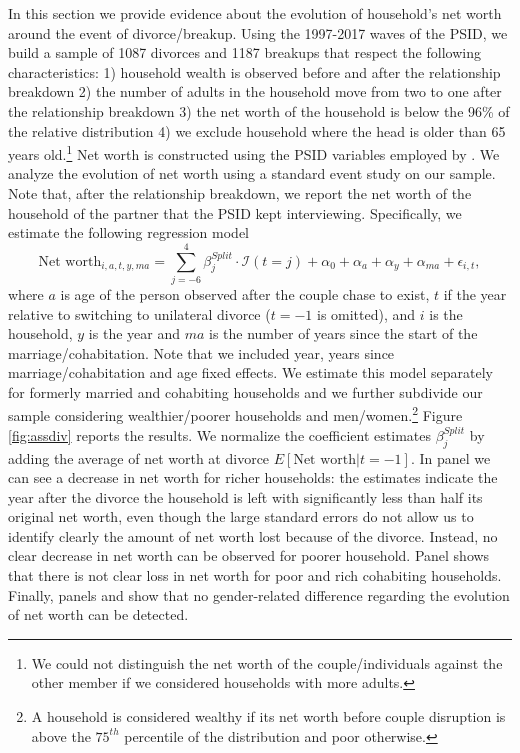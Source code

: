 \documentclass[12pt]{article}
\numberwithin{table}{section}
\begin{document}
In this section we provide evidence about the evolution of household's net worth around the event of divorce/breakup. Using the 1997-2017 waves of the PSID, we build a sample of 1087 divorces and 1187 breakups that respect the following characteristics: 1) household wealth is observed before and after the relationship  breakdown 2) the number of adults in the household move from two to one after the relationship breakdown 3) the net worth of the household is below the 96\% of the relative distribution 4) we exclude household where the head is older than 65 years old.\footnote{We could not distinguish the net worth of the couple/individuals against the other member if we considered households with more adults.} Net worth is constructed using the PSID variables employed by \cite{blundell2016}. We analyze the evolution of net worth using a standard event study on our sample. Note that, after the relationship breakdown, we report the net worth of the household of the partner that the PSID kept interviewing. Specifically, we estimate the following regression model
\begin{equation}\label{eq:ev_studa}
\text{Net worth}_{i,a,t,y,ma}=\sum_{j=-6}^{4}\beta^{Split}_j\cdot\mathcal{I}(t=j)+\alpha_{0}+\alpha_{a}+\alpha_{y}+\alpha_{ma}+\epsilon_{i,t},
\end{equation}
where $a$ is age of the person observed after the couple chase to exist, $t$ if the year relative to switching to unilateral divorce ($t=-1$ is omitted), and $i$ is the household, $y$ is the year and $ma$ is the number of years since the start of the marriage/cohabitation. Note that we included year, years since marriage/cohabitation and age fixed effects.  We estimate this model separately for formerly married and cohabiting households and we further subdivide our sample considering wealthier/poorer households and men/women.\footnote{A household is considered wealthy if its net worth before couple disruption is above the $75^{th}$ percentile of the distribution and poor otherwise.} Figure \ref{fig:assdiv} reports the results. We normalize the coefficient estimates $\beta^{Split}_j$ by adding the average of net worth at divorce $E[\text{Net worth}|t = -1]$. In panel  we can see a decrease in net worth for richer households: the estimates indicate the year after the divorce the household is left with significantly less than half its original net worth, even though the large standard errors do not allow us to identify clearly the amount of net worth lost because of the divorce. Instead, no clear decrease in net worth can be observed for poorer household. Panel  shows that there is not clear loss in net worth for poor and rich cohabiting households. Finally, panels  and  show that no gender-related difference regarding the evolution of net worth can be detected.
\end{document}
